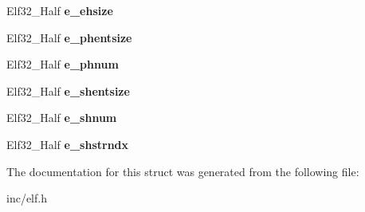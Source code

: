 \begin{DoxyCompactItemize}
\item 
Elf32\+\_\+\+Half {\bfseries e\+\_\+ehsize}\hypertarget{structElf32__Ehdr_a04c658023e50479eed64f6d1b00a2504}{}\label{structElf32__Ehdr_a04c658023e50479eed64f6d1b00a2504}

\item 
Elf32\+\_\+\+Half {\bfseries e\+\_\+phentsize}\hypertarget{structElf32__Ehdr_afa2289f96d86fcc568a3b1f40cc8953e}{}\label{structElf32__Ehdr_afa2289f96d86fcc568a3b1f40cc8953e}

\item 
Elf32\+\_\+\+Half {\bfseries e\+\_\+phnum}\hypertarget{structElf32__Ehdr_a360898812db1655f8cb8258780d9df5b}{}\label{structElf32__Ehdr_a360898812db1655f8cb8258780d9df5b}

\item 
Elf32\+\_\+\+Half {\bfseries e\+\_\+shentsize}\hypertarget{structElf32__Ehdr_ab53c709a841960e499da68e2316ed428}{}\label{structElf32__Ehdr_ab53c709a841960e499da68e2316ed428}

\item 
Elf32\+\_\+\+Half {\bfseries e\+\_\+shnum}\hypertarget{structElf32__Ehdr_a11249bd7e61642742a68a3e7f69ac721}{}\label{structElf32__Ehdr_a11249bd7e61642742a68a3e7f69ac721}

\item 
Elf32\+\_\+\+Half {\bfseries e\+\_\+shstrndx}\hypertarget{structElf32__Ehdr_a3b3070ccd7d971e8cb6ea58d4c6fab09}{}\label{structElf32__Ehdr_a3b3070ccd7d971e8cb6ea58d4c6fab09}

\end{DoxyCompactItemize}


The documentation for this struct was generated from the following file\+:\begin{DoxyCompactItemize}
\item 
inc/elf.\+h\end{DoxyCompactItemize}
